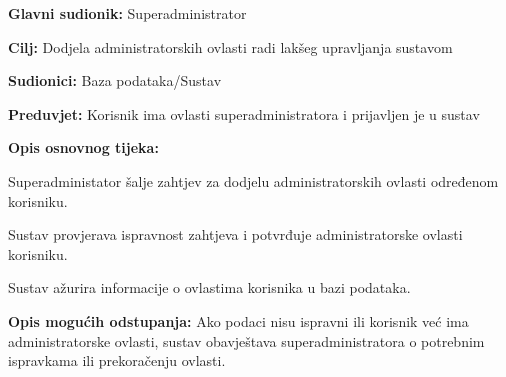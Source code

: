                \noindent {}
					\begin{packed_item}
	
						\item \textbf{Glavni sudionik: }Superadministrator
						\item  \textbf{Cilj:} Dodjela administratorskih ovlasti radi lakšeg upravljanja sustavom
						\item  \textbf{Sudionici:} Baza podataka/Sustav
						\item  \textbf{Preduvjet:} Korisnik ima ovlasti superadministratora i prijavljen je u sustav
						\item  \textbf{Opis osnovnog tijeka:}
						
						\item[] \begin{packed_enum}
	
							\item Superadministator šalje zahtjev za dodjelu administratorskih ovlasti određenom korisniku.
							\item Sustav provjerava ispravnost zahtjeva i potvrđuje administratorske ovlasti korisniku.
                            \item Sustav ažurira informacije o ovlastima korisnika u bazi podataka.
	
						\end{packed_enum}
						
						\item  \textbf{Opis mogućih odstupanja:} Ako podaci nisu ispravni ili korisnik već ima administratorske ovlasti, sustav obavještava superadministratora o potrebnim ispravkama ili prekoračenju ovlasti.
						
						
					\end{packed_item}

